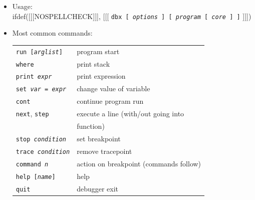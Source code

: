 
\begin{slide}
\begin{itemize}
\item Usage:\\
ifdef([[[NOSPELLCHECK]]], [[[
\texttt{dbx [ \emph{options} ] [ \emph{program} [ \emph{core} ] ]}
]]])
\item Most common commands:\\
\renewcommand{\arraystretch}{0.9}
\begin{tabular}{ll}
\texttt{run [\emph{arglist}]} & program start\\
\texttt{where} & print stack\\
\texttt{print \emph{expr}} & print expression\\
\texttt{set \emph{var} = \emph{expr}} & change value of variable\\
\texttt{cont} & continue program run\\
\texttt{next}, \texttt{step} & execute a line (with/out going into\\*
& function)\\
\texttt{stop \emph{condition}} & set breakpoint\\
\texttt{trace \emph{condition}} & remove tracepoint\\
\texttt{command \emph{n}} & action on breakpoint (commands follow)\\
\texttt{help [\emph{name}]} & help\\
\texttt{quit} & debugger exit
\end{tabular}
\end{itemize}
\end{slide}

